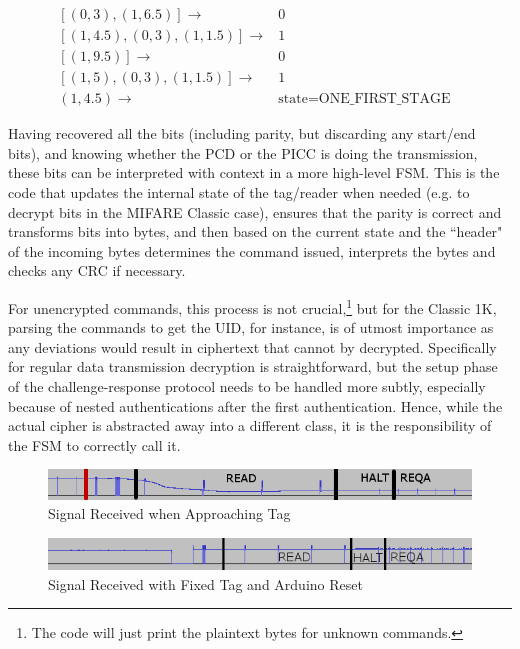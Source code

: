 \documentclass[fleqn,10pt]{SelfArx} %
\begin{document}
\begin{align}
\nonumber [(0, 3), (1, 6.5)] \rightarrow& 0&\\
\nonumber [(1, 4.5), (0, 3), (1, 1.5)]\rightarrow & 1&\\
\nonumber [(1, 9.5)] \rightarrow & 0 &\\
\nonumber [(1, 5), (0, 3), (1, 1.5)] \rightarrow & 1 &\\
\nonumber  (1, 4.5) \rightarrow & \text{state=ONE\_FIRST\_STAGE} &
\end{align}

Having recovered all the bits (including parity, but discarding any start/end bits), and knowing whether the PCD or the PICC is doing the transmission, these bits can be interpreted with context in a more high-level FSM. This is the code that updates the internal state of the tag/reader when needed (e.g. to decrypt bits in the MIFARE Classic case), ensures that the parity is correct and transforms bits into bytes, and then based on the current state and the ``header" of the incoming bytes determines the command issued, interprets the bytes and checks any CRC if necessary. 

For unencrypted commands, this process is not crucial,\footnote{The code will just print the plaintext bytes for unknown commands.} but for the Classic 1K, parsing the commands to get the UID, for instance, is of utmost importance as any deviations would result in ciphertext that cannot by decrypted. Specifically for regular data transmission decryption is straightforward, but the setup phase of the challenge-response protocol needs to be handled more subtly, especially because of nested authentications after the first authentication. Hence, while the actual cipher is abstracted away into a different class, it is the responsibility of the FSM to correctly call it.


\begin{figure}[ht]
  \includegraphics[width=\linewidth]{img/usrpreal}
  \caption{Signal Received when Approaching Tag}
  \label{fig:usrpreal}
\end{figure}


\begin{figure}[ht]
  \includegraphics[width=\linewidth]{img/usrpreset}
  \caption{Signal Received with Fixed Tag and Arduino Reset}
  \label{fig:usrpreset}
\end{figure}
\end{document}
